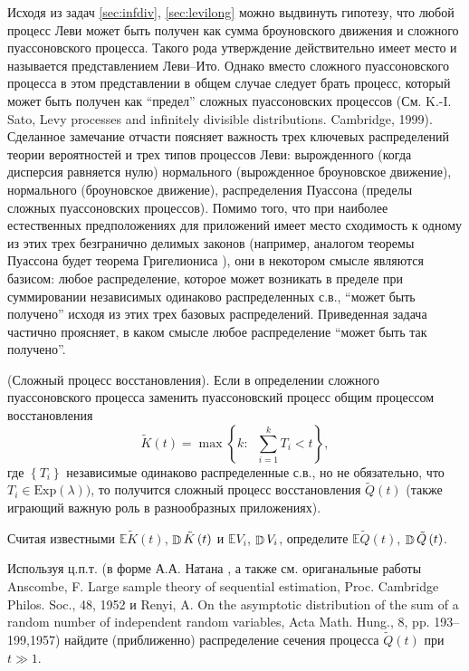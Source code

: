\begin{remark} Исходя из задач \ref{sec:infdiv}, \ref{sec:levilong}
можно выдвинуть гипотезу, что любой процесс Леви может быть получен как 
сумма броуновского движения и сложного пуассоновского процесса. Такого рода 
утверждение действительно имеет место и называется представлением 
Леви--Ито. Однако вместо сложного пуассоновского процесса в этом 
представлении в общем случае следует брать процесс, который может быть 
получен как ``предел'' сложных пуассоновских процессов (См. K.-I. 
Sato, Levy processes and infinitely divisible distributions. Cambridge, 
1999). Сделанное замечание отчасти поясняет важность трех ключевых 
распределений теории вероятностей и трех типов процессов Леви: вырожденного (когда дисперсия равняется нулю)  
нормального (вырожденное 
броуновское движение), нормального (броуновское движение), распределения 
Пуассона (пределы сложных пуассоновских процессов). Помимо того, что при 
наиболее естественных предположениях для приложений имеет место сходимость к 
одному из этих трех безгранично делимых законов (например, аналогом теоремы 
Пуассона будет теорема Григелиониса \cite{4}), они в некотором смысле являются 
базисом: любое распределение, которое может возникать в пределе при 
суммировании независимых одинаково распределенных с.в., ``может быть 
получено'' исходя из этих трех базовых распределений. Приведенная задача частично 
проясняет, в каком смысле любое распределение ``может быть так получено''.
\end{remark}

\begin{problem} (Сложный процесс восстановления). Если в 
определении сложного пуассоновского процесса заменить пуассоновский процесс  общим процессом восстановления $$\tilde {K}\left( t \right)=\max \left\{ 
{k:\;\;\sum\limits_{i=1}^k {T_i } <t} \right\},$$ где $\left\{ {T_i } 
\right\}$ независимые одинаково распределенные с.в., но не обязательно, что $T_i \in \mbox{Exp}\left( \lambda 
\right))$, то получится сложный процесс восстановления $\tilde 
{Q}\left( t \right)$ (также играющий важную роль в разнообразных 
приложениях). 

Считая известными $\mathbb{E}\tilde {K}\left( t \right)$, $\mathop{\mathbb{D}}\nolimits\tilde 
{K}\left( t \right)$ и $\mathbb{E}V_i $, $\mathop{\mathbb{D}}\nolimits V_i $, определите $\mathbb{E}\tilde {Q}\left( t 
\right)$, $\mathop{\mathbb{D}}\nolimits\tilde {Q}\left( t \right)$. 

Используя ц.п.т. (в форме А.А. 
Натана \cite{5}, а также см. ориганальные работы  Anscombe, F. Large sample theory of sequential estimation, Proc. Cambridge Philos. Soc., 48, 1952 и  Renyi, A. On the asymptotic distribution of the sum of a random number of
independent random variables, Acta Math. Hung., 8, pp. 193–199,1957) найдите (приближенно) распределение сечения процесса $\tilde 
{Q}\left( t \right)$ при $t\gg 1$.
\end{problem}




